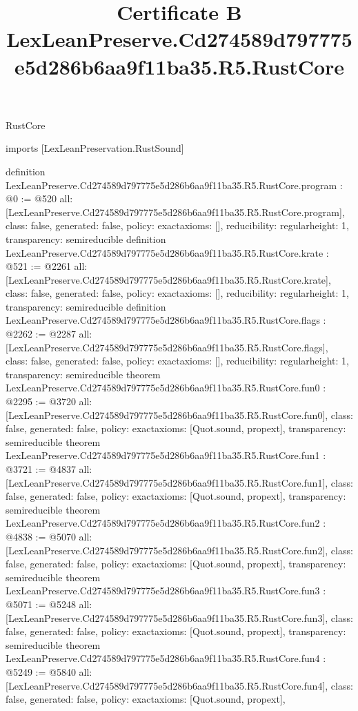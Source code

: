 \begin{lexlean}{RustCore}
\title{Certificate B LexLeanPreserve.Cd274589d797775e5d286b6aa9f11ba35.R5.RustCore}
\begin{coremodule}
imports [LexLeanPreservation.RustSound]

definition LexLeanPreserve.Cd274589d797775e5d286b6aa9f11ba35.R5.RustCore.program : @0 := @520 {
  all: [LexLeanPreserve.Cd274589d797775e5d286b6aa9f11ba35.R5.RustCore.program],
  class: false,
  generated: false,
  policy: exact{axioms: []},
  reducibility: regular{height: 1},
  transparency: semireducible
}
definition LexLeanPreserve.Cd274589d797775e5d286b6aa9f11ba35.R5.RustCore.krate : @521 := @2261 {
  all: [LexLeanPreserve.Cd274589d797775e5d286b6aa9f11ba35.R5.RustCore.krate],
  class: false,
  generated: false,
  policy: exact{axioms: []},
  reducibility: regular{height: 1},
  transparency: semireducible
}
definition LexLeanPreserve.Cd274589d797775e5d286b6aa9f11ba35.R5.RustCore.flags : @2262 := @2287 {
  all: [LexLeanPreserve.Cd274589d797775e5d286b6aa9f11ba35.R5.RustCore.flags],
  class: false,
  generated: false,
  policy: exact{axioms: []},
  reducibility: regular{height: 1},
  transparency: semireducible
}
theorem LexLeanPreserve.Cd274589d797775e5d286b6aa9f11ba35.R5.RustCore.fun0 : @2295 := @3720 {
  all: [LexLeanPreserve.Cd274589d797775e5d286b6aa9f11ba35.R5.RustCore.fun0],
  class: false,
  generated: false,
  policy: exact{axioms: [Quot.sound, propext]},
  transparency: semireducible
}
theorem LexLeanPreserve.Cd274589d797775e5d286b6aa9f11ba35.R5.RustCore.fun1 : @3721 := @4837 {
  all: [LexLeanPreserve.Cd274589d797775e5d286b6aa9f11ba35.R5.RustCore.fun1],
  class: false,
  generated: false,
  policy: exact{axioms: [Quot.sound, propext]},
  transparency: semireducible
}
theorem LexLeanPreserve.Cd274589d797775e5d286b6aa9f11ba35.R5.RustCore.fun2 : @4838 := @5070 {
  all: [LexLeanPreserve.Cd274589d797775e5d286b6aa9f11ba35.R5.RustCore.fun2],
  class: false,
  generated: false,
  policy: exact{axioms: [Quot.sound, propext]},
  transparency: semireducible
}
theorem LexLeanPreserve.Cd274589d797775e5d286b6aa9f11ba35.R5.RustCore.fun3 : @5071 := @5248 {
  all: [LexLeanPreserve.Cd274589d797775e5d286b6aa9f11ba35.R5.RustCore.fun3],
  class: false,
  generated: false,
  policy: exact{axioms: [Quot.sound, propext]},
  transparency: semireducible
}
theorem LexLeanPreserve.Cd274589d797775e5d286b6aa9f11ba35.R5.RustCore.fun4 : @5249 := @5840 {
  all: [LexLeanPreserve.Cd274589d797775e5d286b6aa9f11ba35.R5.RustCore.fun4],
  class: false,
  generated: false,
  policy: exact{axioms: [Quot.sound, propext]},
}
\end{coremodule}
\end{lexlean}
